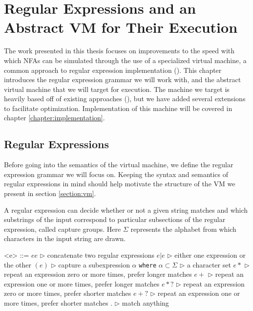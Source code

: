 \chapter{Regular Expressions and an Abstract VM for Their Execution}
\label{chapter:abstractvm}

The work presented in this thesis focuses on improvements to the
speed with which NFAs can be simulated through the use of a
specialized virtual machine, a common approach to regular
expression implementation (\cite{CoxVirtualMachineApproach}).
This chapter introduces the regular expression grammar we will
work with, and the abstract virtual machine that we will target for
execution. The machine we target is heavily based off of existing
approaches (\cite{CoxVirtualMachineApproach}), but we have added several
extensions to facilitate optimization.
Implementation of this machine will be covered in chapter
\ref{chapter:implementation}.

\section{Regular Expressions}
\label{section:regexdef}

Before going into the semantics of the virtual machine, we
define the regular expression grammar we will focus on.
Keeping the syntax and semantics of regular expressions in
mind should help motivate the structure of the VM we present
in section \ref{section:vm}.

A regular expression can decide whether or not a given string
matches and which substrings of the input correspond to particular
subsections of the regular expression, called capture groups.
Here $\Sigma$ represents the alphabet from which characters in
the input string are drawn.

\begin{grammar}
  <e> ::= $e e$ \qquad $\triangleright$ concatenate two regular expressions
  \alt $e \rvert e$ \qquad $\triangleright$ either one expression or the other
  \alt $(e)$ \qquad $\triangleright$ capture a subexpression
  \alt $\alpha$ {\tt where} $\alpha \subset \Sigma$
        \qquad $\triangleright$ a character set
  \alt $e*$ \qquad $\triangleright$
                repeat an expression zero or more times, prefer longer matches
  \alt $e+$ \qquad $\triangleright$ 
                repeat an expression one or more times, prefer longer matches
  \alt $e*?$ \qquad $\triangleright$
                repeat an expression zero or more times, prefer shorter matches
  \alt $e+?$ \qquad $\triangleright$
                repeat an expression one or more times, prefer shorter matches
  \alt $.$ \qquad $\triangleright$
                match anything
\end{grammar}

